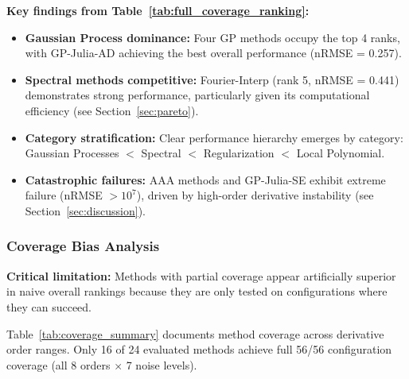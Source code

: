 \textbf{Key findings from Table~\ref{tab:full_coverage_ranking}:}
\begin{itemize}
    \item \textbf{Gaussian Process dominance:} Four GP methods occupy the top 4 ranks, with GP-Julia-AD achieving the best overall performance (nRMSE = 0.257).
    \item \textbf{Spectral methods competitive:} Fourier-Interp (rank 5, nRMSE = 0.441) demonstrates strong performance, particularly given its computational efficiency (see Section~\ref{sec:pareto}).
    \item \textbf{Category stratification:} Clear performance hierarchy emerges by category: Gaussian Processes $<$ Spectral $<$ Regularization $<$ Local Polynomial.
    \item \textbf{Catastrophic failures:} AAA methods and GP-Julia-SE exhibit extreme failure (nRMSE $>10^7$), driven by high-order derivative instability (see Section~\ref{sec:discussion}).
\end{itemize}

\subsubsection{Coverage Bias Analysis}
\label{sec:coverage_bias}

\textbf{Critical limitation:} Methods with partial coverage appear artificially superior in naive overall rankings because they are only tested on configurations where they can succeed.

Table~\ref{tab:coverage_summary} documents method coverage across derivative order ranges. Only 16 of 24 evaluated methods achieve full 56/56 configuration coverage (all 8 orders $\times$ 7 noise levels).


